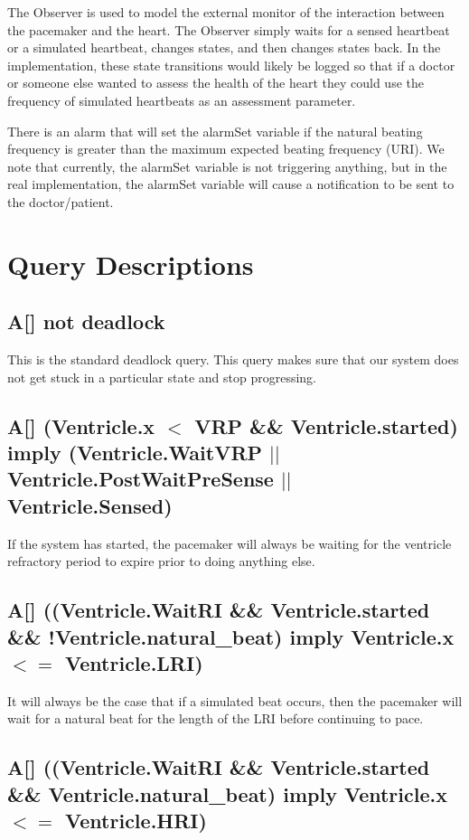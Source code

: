 \documentclass[10pt]{article}
\begin{document}
The Observer is used to model the external monitor of the interaction between the pacemaker and the heart. The Observer simply waits for a sensed heartbeat or a simulated heartbeat, changes states, and then changes states back. In the implementation, these state transitions would likely be logged so that if a doctor or someone else wanted to assess the health of the heart they could use the frequency of simulated heartbeats as an assessment parameter.

There is an alarm that will set the alarmSet variable if the natural beating frequency is greater than the maximum expected beating frequency (URI). We note that currently, the alarmSet variable is not triggering anything, but in the real implementation, the alarmSet variable will cause a notification to be sent to the doctor/patient.


\section{Query Descriptions}


	\subsection{A[] not deadlock}
		This is the standard deadlock query. This query makes sure that our system does not get stuck in a particular state and stop progressing.


	\subsection{A[] (Ventricle.x $<$ VRP \&\& Ventricle.started) imply (Ventricle.WaitVRP $||$ Ventricle.PostWaitPreSense $||$ Ventricle.Sensed)}

	If the system has started, the pacemaker will always be waiting for the ventricle refractory period to expire prior to doing anything else.

	\subsection{A[] ((Ventricle.WaitRI \&\& Ventricle.started \&\& !Ventricle.natural\_beat) imply Ventricle.x $<=$ Ventricle.LRI)}

	It will always be the case that if a simulated beat occurs, then the pacemaker will wait for a natural beat for the length of the LRI before continuing to pace.

	\subsection{A[] ((Ventricle.WaitRI \&\& Ventricle.started \&\& Ventricle.natural\_beat) imply Ventricle.x $<=$ Ventricle.HRI)}
\end{document}
